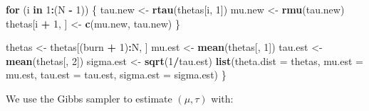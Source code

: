 \documentclass[
  11pt,
]{paper}
\newenvironment{Shaded}{\begin{snugshade}}{\end{snugshade}}
\newcommand{\AttributeTok}[1]{\textcolor[rgb]{0.13,0.29,0.53}{#1}}
\newcommand{\CommentTok}[1]{\textcolor[rgb]{0.56,0.35,0.01}{\textit{#1}}}
\newcommand{\ControlFlowTok}[1]{\textcolor[rgb]{0.13,0.29,0.53}{\textbf{#1}}}
\newcommand{\DecValTok}[1]{\textcolor[rgb]{0.00,0.00,0.81}{#1}}
\newcommand{\FloatTok}[1]{\textcolor[rgb]{0.00,0.00,0.81}{#1}}
\newcommand{\FunctionTok}[1]{\textcolor[rgb]{0.13,0.29,0.53}{\textbf{#1}}}
\newcommand{\NormalTok}[1]{#1}
\newcommand{\OtherTok}[1]{\textcolor[rgb]{0.56,0.35,0.01}{#1}}
\newcommand{\SpecialCharTok}[1]{\textcolor[rgb]{0.81,0.36,0.00}{\textbf{#1}}}
\begin{document}
\begin{Shaded}
\begin{Highlighting}[]
    \ControlFlowTok{for}\NormalTok{ (i }\ControlFlowTok{in} \DecValTok{1}\SpecialCharTok{:}\NormalTok{(N }\SpecialCharTok{{-}} \DecValTok{1}\NormalTok{)) \{}
\NormalTok{        tau.new }\OtherTok{\textless{}{-}} \FunctionTok{rtau}\NormalTok{(thetas[i, }\DecValTok{1}\NormalTok{])}
\NormalTok{        mu.new }\OtherTok{\textless{}{-}} \FunctionTok{rmu}\NormalTok{(tau.new)}
\NormalTok{        thetas[i }\SpecialCharTok{+} \DecValTok{1}\NormalTok{, ] }\OtherTok{\textless{}{-}} \FunctionTok{c}\NormalTok{(mu.new, tau.new)}
\NormalTok{    \}}

\NormalTok{    thetas }\OtherTok{\textless{}{-}}\NormalTok{ thetas[(burn }\SpecialCharTok{+} \DecValTok{1}\NormalTok{)}\SpecialCharTok{:}\NormalTok{N, ]}
\NormalTok{    mu.est }\OtherTok{\textless{}{-}} \FunctionTok{mean}\NormalTok{(thetas[, }\DecValTok{1}\NormalTok{])}
\NormalTok{    tau.est }\OtherTok{\textless{}{-}} \FunctionTok{mean}\NormalTok{(thetas[, }\DecValTok{2}\NormalTok{])}
\NormalTok{    sigma.est }\OtherTok{\textless{}{-}} \FunctionTok{sqrt}\NormalTok{(}\DecValTok{1}\SpecialCharTok{/}\NormalTok{tau.est)}
    \FunctionTok{list}\NormalTok{(}\AttributeTok{theta.dist =}\NormalTok{ thetas, }\AttributeTok{mu.est =}\NormalTok{ mu.est, }\AttributeTok{tau.est =}\NormalTok{ tau.est, }\AttributeTok{sigma.est =}\NormalTok{ sigma.est)}
\NormalTok{\}}
\end{Highlighting}
\end{Shaded}

We use the Gibbs sampler to estimate \((\mu,\tau)\) with:

\begin{Shaded}
\end{Shaded}
\end{document}
